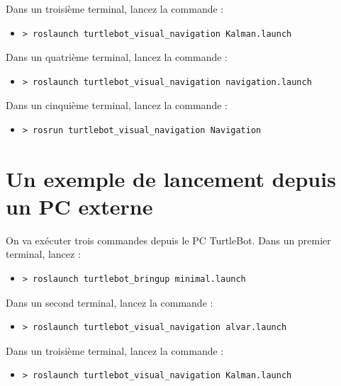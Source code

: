 \documentclass[10pt,a4paper]{article}
\begin{document}
Dans un troisième terminal, lancez la commande :
\begin{itemize}
\item[] \begin{verbatim}> roslaunch turtlebot_visual_navigation Kalman.launch \end{verbatim}
\end{itemize}

Dans un quatrième terminal, lancez la commande :
\begin{itemize}
\item[] \begin{verbatim}> roslaunch turtlebot_visual_navigation navigation.launch \end{verbatim}
\end{itemize}

Dans un cinquième terminal, lancez la commande :
\begin{itemize}
\item[] \begin{verbatim}> rosrun turtlebot_visual_navigation Navigation \end{verbatim}
\end{itemize}

\section{Un exemple de lancement depuis un PC externe}

On va exécuter trois commandes depuis le PC TurtleBot. Dans un premier terminal, lancez :
\begin{itemize}
\item[] \begin{verbatim}> roslaunch turtlebot_bringup minimal.launch \end{verbatim}
\end{itemize}

Dans un second terminal, lancez la commande :
\begin{itemize}
\item[] \begin{verbatim}> roslaunch turtlebot_visual_navigation alvar.launch \end{verbatim}
\end{itemize}

Dans un troisième terminal, lancez la commande :
\begin{itemize}
\item[] \begin{verbatim}> roslaunch turtlebot_visual_navigation Kalman.launch \end{verbatim}
\end{itemize}
\end{document}
